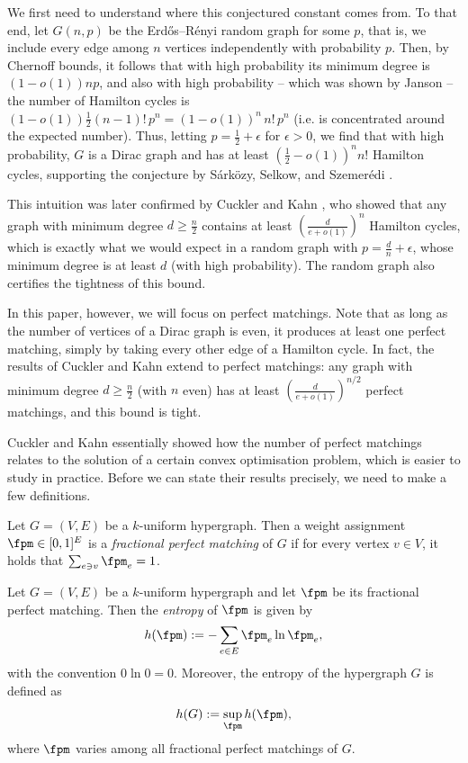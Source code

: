 \documentclass[11pt]{article}
\begin{document}
We first need to understand where this conjectured constant comes from. To that end, let $G(n,p)$ be the Erd\H{o}s--R\'enyi random graph for some $p$, that is, we include every edge among $n$ vertices independently with probability $p$. Then, by Chernoff bounds, it follows that with high probability its minimum degree is $(1-o(1))np$, and also with high probability -- which was shown by Janson \cite{janson1994numbers} -- the number of Hamilton cycles is $(1-o(1))\frac{1}{2}(n-1)!\,p^n=(1-o(1))^n\,n!\,p^n$ (i.e. is concentrated around the expected number). Thus, letting $p=\frac{1}{2}+\epsilon$ for $\epsilon>0$, we find that with high probability, $G$ is a Dirac graph and has at least $(\frac{1}{2}-o(1))^nn!$ Hamilton cycles, supporting the conjecture by S\'ark\"ozy, Selkow, and Szemer\'edi \cite{sarkozy2003number}. 

This intuition was later confirmed by Cuckler and Kahn \cite{cuckler2009entropy,cuckler2009hamiltonian}, who showed that any graph with minimum degree $d\geq\frac{n}{2}$ contains at least $\left(\frac{d}{e+o(1)}\right)^n$ Hamilton cycles, which is exactly what we would expect in a random graph with $p=\frac{d}{n}+\epsilon$, whose minimum degree is at least $d$ (with high probability). The random graph also certifies the tightness of this bound.

In this paper, however, we will focus on perfect matchings. Note that as long as the number of vertices of a Dirac graph is even, it produces at least one perfect matching, simply by taking every other edge of a Hamilton cycle. In fact, the results of Cuckler and Kahn \cite{cuckler2009entropy,cuckler2009hamiltonian} extend to perfect matchings: any graph with minimum degree $d\ge\frac{n}{2}$ (with $n$ even) has at least $\left(\frac{d}{e+o(1)}\right)^{n/2}$ perfect matchings, and this bound is tight.

Cuckler and Kahn essentially showed how the number of perfect matchings relates to the solution of a certain convex optimisation problem, which is easier to study in practice. Before we can state their results precisely, we need to make a few definitions.

\begin{definition}\label{def-fpm}
    Let $G=(V,E)$ be a $k$-uniform hypergraph. Then a weight assignment $\fpm\in[0,1]^E$ is a \emph{fractional perfect matching} of $G$ if for every vertex $v\in V$, it holds that $\sum_{e\ni v}\fpm_e=1$.
\end{definition}

\begin{definition}\label{def-entropy}
    Let $G=(V,E)$ be a $k$-uniform hypergraph and let $\fpm$ be its fractional perfect matching. Then the \emph{entropy} of $\fpm$ is given by
    $$h(\fpm):=-\sum_{e\in E}\fpm_e\ln \fpm_e,$$
    with the convention $0\ln0=0$. Moreover, the entropy of the hypergraph $G$ is defined as
    $$h(G):=\sup_{\fpm} h(\fpm),$$
    where $\fpm$ varies among all fractional perfect matchings of $G$.
\end{definition}
\end{document}
